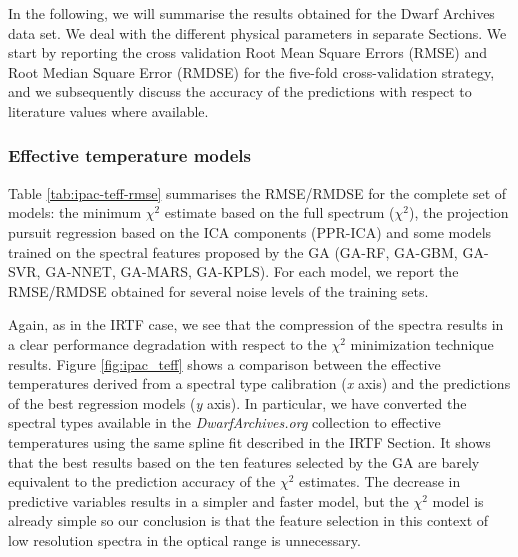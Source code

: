 
In the following, we will summarise the results obtained for the Dwarf Archives
data set. We deal with the different physical parameters in separate
Sections. We start by reporting the cross validation Root Mean Square
Errors (RMSE) and Root Median Square Error (RMDSE) for the five-fold
cross-validation strategy, and we subsequently discuss the accuracy of
the predictions with respect to literature values where available.

\subsubsection{Effective temperature models}

Table \ref{tab:ipac-teff-rmse} summarises the RMSE/RMDSE for the
complete set of models: the minimum $\chi^2$ estimate based on the
full spectrum ($\chi^2$), the projection pursuit regression based on
the ICA components (PPR-ICA) and some models trained on the spectral
features proposed by the GA (GA-RF, GA-GBM, GA-SVR, GA-NNET, GA-MARS,
GA-KPLS). For each model, we report the RMSE/RMDSE obtained for
several noise levels of the training sets.

Again, as in the IRTF case, we see that the compression of the spectra
results in a clear performance degradation with respect to the
$\chi^2$ minimization technique results. Figure \ref{fig:ipac_teff} shows
a comparison between the effective temperatures derived from a
spectral type calibration ({\it x} axis) and the predictions of the
best regression models ({\it y} axis). In particular, we have
converted the spectral types available in the {\it DwarfArchives.org}
collection to effective temperatures using the same spline fit
described in the IRTF Section. It shows that the best results based on
the ten features selected by the GA are barely equivalent to the
prediction accuracy of the $\chi^2$ estimates. The decrease in
predictive variables results in a simpler and faster model, but the
$\chi^2$ model is already simple so our conclusion is that the feature
selection in this context of low resolution spectra in the optical
range is unnecessary.

